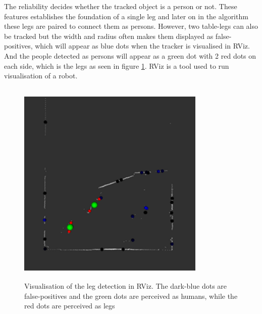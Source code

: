 The reliability decides whether the tracked object is a person or not. These features establishes the foundation of a single leg and later on in the algorithm these legs are paired to connect them as persons. However, two table-legs can also be tracked but the width and radius often makes them displayed as false-positives, which will appear as blue dots when the tracker is visualised in RViz. And the people detected as persons will appear as a green dot with 2 red dots on each side, which is the legs as seen in figure \ref{fig:rviz}. RViz is a tool used to run visualisation of a robot.\\

\begin{figure}[H]
    \centering
    \includegraphics[width=0.8\textwidth, height=10cm]{figures/rviz.png}
    \caption{Visualisation of the leg detection in RViz. The dark-blue dots are false-positives and the green dots are perceived as humans, while the red dots are perceived as legs}
    \label{fig:rviz}
\end{figure}

